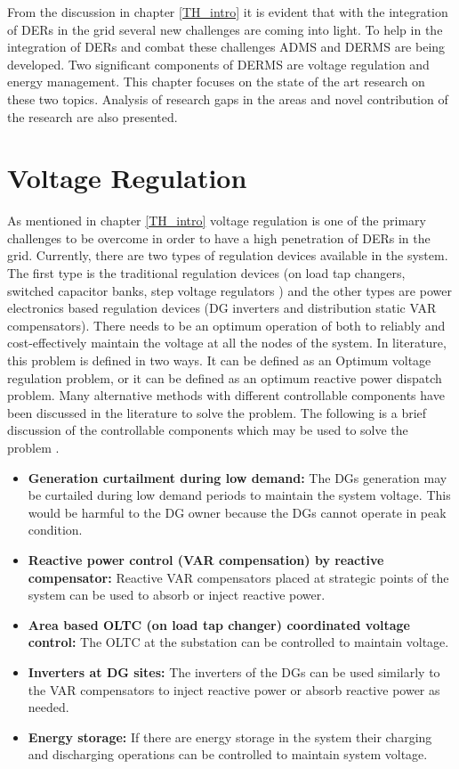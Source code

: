 From the discussion in chapter \ref{TH_intro} it is evident that with the integration of DERs in the grid several new challenges are coming into light. To help in the integration of DERs and combat these challenges ADMS and DERMS are being developed. Two significant components of DERMS are voltage regulation and energy management. This chapter focuses on the state of the art research on these two topics. Analysis of research gaps in the areas and novel contribution of the research are also presented. 
\section{Voltage Regulation}
As mentioned in chapter \ref{TH_intro} voltage regulation is one of the primary challenges to be overcome in order to have a high penetration of DERs in the grid. Currently, there are two types of regulation devices available in the system. The first type is the traditional regulation devices (on load tap changers, switched capacitor banks, step voltage regulators ) and the other types are power electronics based regulation devices (DG inverters and distribution static VAR compensators). There needs to be an optimum operation of both to reliably and cost-effectively maintain the voltage at all the nodes of the system. In literature, this problem is defined in two ways. It can be defined as an Optimum voltage regulation problem, or it can be defined as an optimum reactive power dispatch problem. Many alternative methods with different controllable components have been discussed in the literature to solve the problem. The following is a brief discussion of the controllable components which may be used to solve the problem \cite{VC_1}. 
\begin{itemize}
    \item \textbf{Generation curtailment during low demand:} The DGs generation may be curtailed during low demand periods to maintain the system voltage. This would be harmful to the DG owner because the DGs cannot operate in peak condition.
    \item \textbf{Reactive power control (VAR compensation) by reactive compensator:} Reactive VAR compensators placed at strategic points of the system can be used to absorb or inject reactive power.  
    \item \textbf{Area based OLTC (on load tap changer) coordinated voltage control:} The OLTC at the substation can be controlled to maintain voltage.
    \item \textbf{Inverters at DG sites:} The inverters of the DGs can be used similarly to the VAR compensators to inject reactive power or absorb reactive power as needed.
    \item \textbf{Energy storage:} If there are energy storage in the system their charging and discharging operations can be controlled to maintain system voltage.
\end{itemize}

